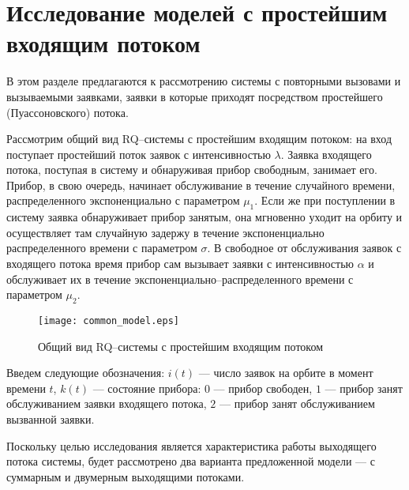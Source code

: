 \section {Исследование моделей с простейшим входящим потоком}
В этом разделе предлагаются к рассмотрению системы с повторными вызовами и вызываемыми заявками, заявки в которые приходят посредством простейшего (Пуассоновского) потока.

Рассмотрим общий вид RQ--системы с простейшим входящим потоком:
на вход поступает простейший поток заявок с интенсивностью $\lambda$. Заявка входящего потока, поступая в систему и обнаруживая прибор свободным, занимает его. Прибор, в свою очередь, начинает обслуживание в течение случайного времени, распределенного экспоненциально с параметром $\mu_{1}$. Если же при поступлении в систему заявка обнаруживает прибор занятым, она мгновенно уходит на орбиту и осуществляет там случайную задержу в течение экспоненциально распределенного времени с параметром $\sigma$. В свободное от обслуживания заявок с входящего потока время прибор сам вызывает заявки с интенсивностью $\alpha$ и обслуживает их в течение экспоненциально--распределенного времени с параметром $\mu_{2}$.
\begin{figure}[H]
	\centering
	\texttt{[image: common\_model.eps]}
	\caption{Общий вид RQ--системы с простейшим входящим потоком}
	\label{common_model_fig}
\end{figure}
Введем следующие обозначения: $i(t)$ --- число заявок на орбите в момент времени $t$, $k(t)$ --- состояние прибора: $0$ --- прибор свободен, $1$ --- прибор занят обслуживанием заявки входящего потока, $2$ --- прибор занят обслуживанием вызванной заявки. 
 
Поскольку целью исследования является характеристика работы выходящего потока системы, будет рассмотрено два варианта предложенной модели --- с суммарным и двумерным выходящими потоками.


